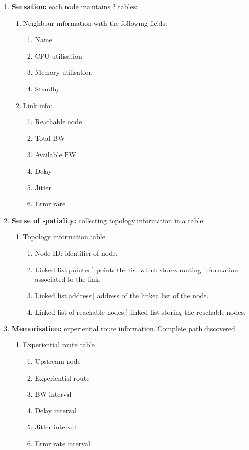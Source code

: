 \begin{enumerate}
\item \textbf{Sensation:} each node maintains 2 tables:
\begin{enumerate}

\item Neighbour information with the following fields: 
\begin{enumerate}
\item Name
\item CPU utilisation 
\item Memory utilisation
\item Standby
\end{enumerate}

\item Link info: 
\begin{enumerate}
\item Reachable node
\item Total BW 
\item Available BW
\item Delay
\item Jitter
\item Error rare
\end{enumerate}
\end{enumerate}

\item \textbf{Sense of spatiality:} collecting topology information in a table:
\begin{enumerate}
\item Topology information table
	 \begin{enumerate}
	 \item Node ID: identifier of node.
	 \item Linked list pointer:] points the list which stores routing information associated to the link.
	 \item Linked list address:] address of the linked list of the node.
	 \item Linked list of reachable nodes:] linked list storing the reachable nodes.
	 \end{enumerate}
\end{enumerate}

\item \textbf{Memorisation:} experiential route information. Complete path discovered.
\begin{enumerate}
\item Experiential route table
	\begin{enumerate}
	\item Upstream node
	\item Experiential route
	\item BW interval
	\item Delay interval
	\item Jitter interval
	\item Error rate interval
	 \end{enumerate}
\end{enumerate}


\end{enumerate}
